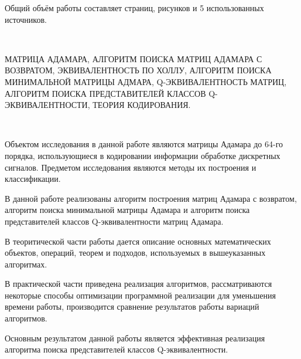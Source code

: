 \documentclass[a4paper, 14pt]{extreport}
\begin{document}






\vkrAbstract
    
Общий объём работы составляет \ztotpages{} страниц, \totalfigures{} рисунков и 5 использованных источников.

~

МАТРИЦА АДАМАРА, АЛГОРИТМ ПОИСКА МАТРИЦ АДАМАРА С ВОЗВРАТОМ, ЭКВИВАЛЕНТНОСТЬ ПО ХОЛЛУ, АЛГОРИТМ ПОИСКА МИНИМАЛЬНОЙ МАТРИЦЫ АДМАРА, Q-ЭКВИВАЛЕНТНОСТЬ МАТРИЦ, АЛГОРИТМ ПОИСКА ПРЕДСТАВИТЕЛЕЙ КЛАССОВ Q-ЭКВИВАЛЕНТНОСТИ, ТЕОРИЯ КОДИРОВАНИЯ.

~

Объектом исследования в данной работе являются матрицы Адамара до 64-го порядка, использующиеся в кодировании информации обработке дискретных сигналов. Предметом исследования являются методы их построения и классификации.

В данной работе реализованы алгоритм построения матриц Адамара с возвратом, алгоритм поиска минимальной матрицы Адамара и алгоритм поиска представителей классов Q-эквивалентности матриц Адамара.

В теоритической части работы дается описание основных математических объектов, операций, теорем и подходов, используемых в вышеуказанных алгоритмах.

В практической части приведена реализация алгоритмов, рассматриваются некоторые способы оптимизации программной реализации для уменьшения времени работы, производится сравнение результатов работы вариаций алгоритмов.

Основным результатом данной работы является эффективная реализация алгоритма поиска представителей классов Q-эквивалентности.

\vkrIntroduction
\end{document}
